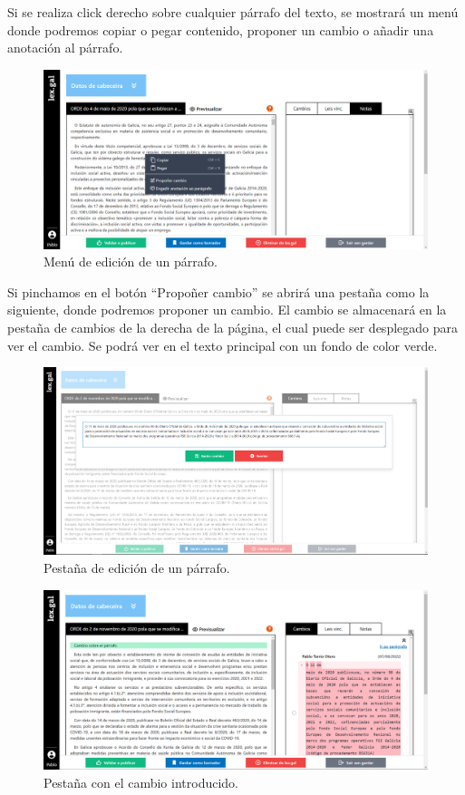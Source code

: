 Si se realiza click derecho sobre cualquier párrafo del texto, se mostrará un menú donde podremos copiar o pegar contenido, proponer un cambio o añadir una anotación al párrafo.

\begin{figure}[H]
\centerline{\includegraphics[width=15cm]{figuras/manualUsuario/EditarContextMenu.PNG}}
\caption{Menú de edición de un párrafo.}
\label{enlaceContextMenuLexGal}
\end{figure}

Si pinchamos en el botón ``Propoñer cambio'' se abrirá una pestaña como la siguiente, donde podremos proponer un cambio. El cambio se almacenará en la pestaña de cambios de la derecha de la página, el cual puede ser desplegado para ver el cambio. Se podrá ver en el texto principal con un fondo de color verde.

\begin{figure}[H]
\centerline{\includegraphics[width=15cm]{figuras/manualUsuario/Cambios.PNG}}
\caption{Pestaña de edición de un párrafo.}
\label{enlaceCambios}
\end{figure}

\begin{figure}[H]
\centerline{\includegraphics[width=15cm]{figuras/manualUsuario/PestanaCambios.PNG}}
\caption{Pestaña con el cambio introducido.}
\label{enlacePestanaCambios}
\end{figure}

